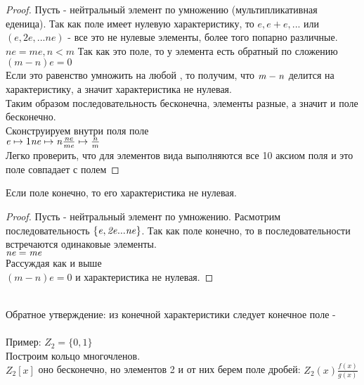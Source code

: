 \begin{proof}
  Пусть  - нейтральный элемент по умножению (мультипликативная еденица).
  Так как поле имеет нулевую характеристику, то $\mathit {e, e+e, ...}$ или
  $\mathit {(e, 2e, ... ne)}$ - все это не нулевые элементы, более того попарно
  различные.\\
  $\mathit {ne = me, n < m}$ Так как это поле, то у элемента  есть
  обратный по сложению $\mathit {(m-n)e=0}$ \\
  Если это равенство умножить на любой , то получим, что $\mathit {m-n}$ делится на
  характеристику, а значит характеристика не нулевая.\\
  Таким образом последовательность бесконечна, элементы разные, а значит и поле
  бесконечно.\\
  Сконструируем внутри поля  поле  \\
  $\mathit {e} \mapsto 1 \\
  \mathit {ne} \mapsto \mathit {n} \\
  \frac{ne}{me} \mapsto \frac{n}{m}$ \\

  Легко проверить, что для элементов вида  выполняются все 10 аксиом
  поля и это поле совпадает с полем 
  \end{proof}

\begin{theorem}
  Если поле конечно, то его характеристика не нулевая.
\end{theorem}

\begin{proof}
  Пусть  - нейтральный элемент по умножению. Расмотрим последовательность
  $\mathit {\{e,2e...ne\}}$. Так как поле конечно, то в последовательности
  встречаются одинаковые элементы.\\
  $\mathit{ne=me}$ \\
  Рассуждая как и выше \\
  $\mathit {(m-n)e=0}$ и характеристика не нулевая.
\end{proof}

 \\
Обратное утверждение: из конечной характеристики следует конечное поле -
 \\

\\
Пример: $Z_{2} = \{0,1\}$ \\
Построим кольцо многочленов. \\
$Z_{2}[x]$ оно бесконечно, но элементов 2 и от них берем поле дробей:
$Z_{2}(x) \frac{f(x)}{g(x)}$ \\

